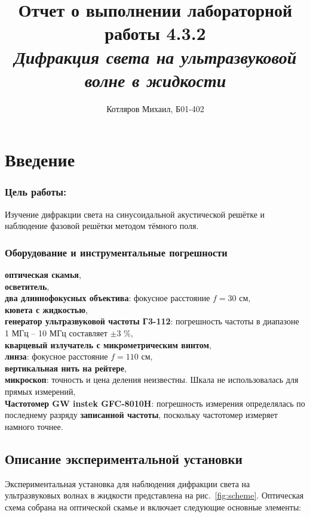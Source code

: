 \documentclass[a4paper]{article}
\title{\textbf{Отчет о выполнении лабораторной работы 4.3.2} \\[0.5em] \large\itshape Дифракция света на ультразвуковой волне в жидкости}
\date{}
\author{Котляров Михаил, Б01-402}
\begin{document}
\maketitle
	
\section{Введение}

\subsubsection*{Цель работы:} Изучение дифракции света на синусоидальной акустической решётке и наблюдение фазовой решётки методом тёмного поля.

\subsubsection*{Оборудование и инструментальные погрешности}

\textbf{оптическая скамья},\\
\textbf{осветитель},\\
\textbf{два длиннофокусных объектива}: фокусное расстояние $f = 30$ см,\\
\textbf{кювета с жидкостью},\\
\textbf{генератор ультразвуковой частоты Г3-112}: погрешность частоты в диапазоне 1 МГц – 10 МГц составляет $\pm 3$ \%,\\
\textbf{кварцевый излучатель с микрометрическим винтом},\\
\textbf{линза}: фокусное расстояние $f = 110$ см,\\
\textbf{вертикальная нить на рейтере},\\
\textbf{микроскоп}: точность и цена деления неизвестны. Шкала не использовалась для прямых измерений,\\
\textbf{Частотомер GW instek GFC-8010H}: погрешность измерения определялась по последнему разряду \textbf{записанной частоты}, поскольку частотомер измеряет намного точнее.

\subsection{Описание экспериментальной установки}

Экспериментальная установка для наблюдения дифракции света на ультразвуковых волнах в жидкости представлена на рис.~\ref{fig:scheme}. Оптическая схема собрана на оптической скамье и включает следующие основные элементы:
\end{document}
